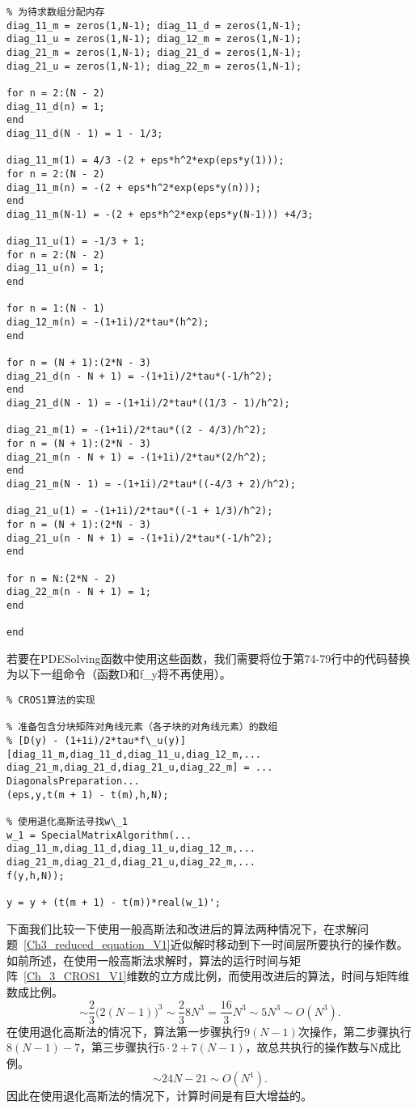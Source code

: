 \documentclass[twoside]{book}
\begin{document}
\begin{CJK*}{GBK}{song}
\begin{lstlisting}
% 为待求数组分配内存
diag_11_m = zeros(1,N-1); diag_11_d = zeros(1,N-1);
diag_11_u = zeros(1,N-1); diag_12_m = zeros(1,N-1);
diag_21_m = zeros(1,N-1); diag_21_d = zeros(1,N-1);
diag_21_u = zeros(1,N-1); diag_22_m = zeros(1,N-1);

for n = 2:(N - 2)
diag_11_d(n) = 1;
end
diag_11_d(N - 1) = 1 - 1/3;

diag_11_m(1) = 4/3 -(2 + eps*h^2*exp(eps*y(1)));
for n = 2:(N - 2)
diag_11_m(n) = -(2 + eps*h^2*exp(eps*y(n)));
end
diag_11_m(N-1) = -(2 + eps*h^2*exp(eps*y(N-1))) +4/3;

diag_11_u(1) = -1/3 + 1;
for n = 2:(N - 2)
diag_11_u(n) = 1;
end

for n = 1:(N - 1)
diag_12_m(n) = -(1+1i)/2*tau*(h^2);
end

for n = (N + 1):(2*N - 3)
diag_21_d(n - N + 1) = -(1+1i)/2*tau*(-1/h^2);
end
diag_21_d(N - 1) = -(1+1i)/2*tau*((1/3 - 1)/h^2);

diag_21_m(1) = -(1+1i)/2*tau*((2 - 4/3)/h^2);
for n = (N + 1):(2*N - 3)
diag_21_m(n - N + 1) = -(1+1i)/2*tau*(2/h^2);
end
diag_21_m(N - 1) = -(1+1i)/2*tau*((-4/3 + 2)/h^2);

diag_21_u(1) = -(1+1i)/2*tau*((-1 + 1/3)/h^2);
for n = (N + 1):(2*N - 3)
diag_21_u(n - N + 1) = -(1+1i)/2*tau*(-1/h^2);
end

for n = N:(2*N - 2)
diag_22_m(n - N + 1) = 1;
end

end
\end{lstlisting}


若要在PDESolving函数中使用这些函数，我们需要将位于第74-79行中的代码替换为以下一组命令（函数D和f\_y将不再使用）。
\begin{lstlisting}
% CROS1算法的实现

% 准备包含分块矩阵对角线元素（各子块的对角线元素）的数组
% [D(y) - (1+1i)/2*tau*f\_u(y)]
[diag_11_m,diag_11_d,diag_11_u,diag_12_m,...
diag_21_m,diag_21_d,diag_21_u,diag_22_m] = ...
DiagonalsPreparation...
(eps,y,t(m + 1) - t(m),h,N);

% 使用退化高斯法寻找w\_1
w_1 = SpecialMatrixAlgorithm(...
diag_11_m,diag_11_d,diag_11_u,diag_12_m,...
diag_21_m,diag_21_d,diag_21_u,diag_22_m,...
f(y,h,N));

y = y + (t(m + 1) - t(m))*real(w_1)';
\end{lstlisting}

下面我们比较一下使用一般高斯法和改进后的算法两种情况下，在求解问题~\eqref{Ch3_reduced_equation_V1}近似解时移动到下一时间层所要执行的操作数。
如前所述，在使用一般高斯法求解时，算法的运行时间与矩阵~\eqref{Ch_3_CROS1_V1}维数的立方成比例，而使用改进后的算法，时间与矩阵维数成比例。
\begin{equation*}
\sim \dfrac{2}{3}\big(2(N - 1)\big)^3 \sim \dfrac{2}{3} 8N^3 = \dfrac{16}{3} N^3 \sim 5N^3 \sim O(N^3).
\end{equation*}
在使用退化高斯法的情况下，算法第一步骤执行$9(N - 1)$次操作，第二步骤执行 $8(N - 1) - 7$，第三步骤执行$5\cdot2 + 7(N -1)$，故总共执行的操作数与N成比例。
\begin{equation*}
\sim 24N - 21 \sim O(N^1).
\end{equation*}
因此在使用退化高斯法的情况下，计算时间是有巨大增益的。


\end{CJK*}
\end{document}
